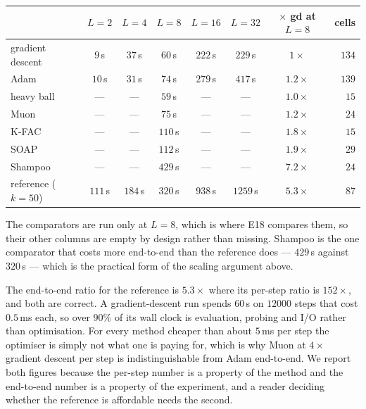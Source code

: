 \documentclass{article} %
\theoremstyle{plain}
\theoremstyle{definition}
\theoremstyle{remark}
\begin{document}
\begin{center}\small
\begin{tabular}{lccccccr}
\toprule
 & $L=2$ & $L=4$ & $L=8$ & $L=16$ & $L=32$ & $\times$ gd at $L=8$ & cells \\
\midrule
gradient descent   & $9$\,s   & $37$\,s  & $60$\,s  & $222$\,s & $229$\,s  & $1\times$ & $134$ \\
Adam               & $10$\,s  & $31$\,s  & $74$\,s  & $279$\,s & $417$\,s  & $1.2\times$ & $139$ \\
heavy ball         & ---      & ---      & $59$\,s  & ---      & ---       & $1.0\times$ & $15$ \\
Muon               & ---      & ---      & $75$\,s  & ---      & ---       & $1.2\times$ & $24$ \\
K-FAC              & ---      & ---      & $110$\,s & ---      & ---       & $1.8\times$ & $15$ \\
SOAP               & ---      & ---      & $112$\,s & ---      & ---       & $1.9\times$ & $29$ \\
Shampoo            & ---      & ---      & $429$\,s & ---      & ---       & $7.2\times$ & $24$ \\
\midrule
reference ($k=50$) & $111$\,s & $184$\,s & $320$\,s & $938$\,s & $1259$\,s & $\mathbf{5.3\times}$ & $87$ \\
\bottomrule
\end{tabular}
\end{center}

\noindent The comparators are run only at $L=8$, which is where E18 compares them, so their other
columns are empty by design rather than missing. Shampoo is the one comparator that costs more
end-to-end than the reference does --- $429$\,s against $320$\,s --- which is the practical form of
the scaling argument above.

The end-to-end ratio for the reference is $5.3\times$ where its per-step ratio is $152\times$, and
both are correct. A gradient-descent run spends $60$\,s on $12000$ steps that cost $0.5$\,ms each,
so over $90\%$ of its wall clock is evaluation, probing and I/O rather than optimisation. For every
method cheaper than about $5$\,ms per step the optimiser is simply not what one is paying for,
which is why Muon at $4\times$ gradient descent per step is indistinguishable from Adam
end-to-end. We report both figures because the per-step number is a property of the method and the
end-to-end number is a property of the experiment, and a reader deciding whether the reference is
affordable needs the second.
\end{document}
